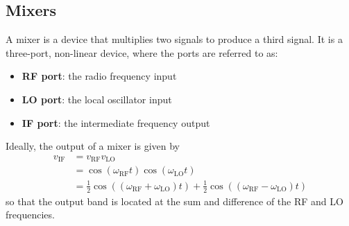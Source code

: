 \documentclass{article}
\begin{document}
\subsection{Mixers}
A mixer is a device that multiplies two signals to produce a third
signal. It is a three-port, non-linear device, where the ports are
referred to as:
\begin{itemize}
    \item \textbf{RF port}: the radio frequency input
    \item \textbf{LO port}: the local oscillator input
    \item \textbf{IF port}: the intermediate frequency output
\end{itemize}
Ideally, the output of a mixer is given by
\begin{align*}
    v_{\mathrm{IF}} & = v_{\mathrm{RF}} v_{\mathrm{LO}}                                                                                                                                                               \\
                    & = \cos{\left( \omega_{\mathrm{RF}} t \right)} \cos{\left( \omega_{\mathrm{LO}} t \right)}                                                                                                       \\
                    & = \frac{1}{2} \cos{\left( \left( \omega_{\mathrm{RF}} + \omega_{\mathrm{LO}} \right) t \right)} + \frac{1}{2} \cos{\left( \left( \omega_{\mathrm{RF}} - \omega_{\mathrm{LO}} \right) t \right)}
\end{align*}
so that the output band is located at the sum and difference of the
RF and LO frequencies.
\end{document}
